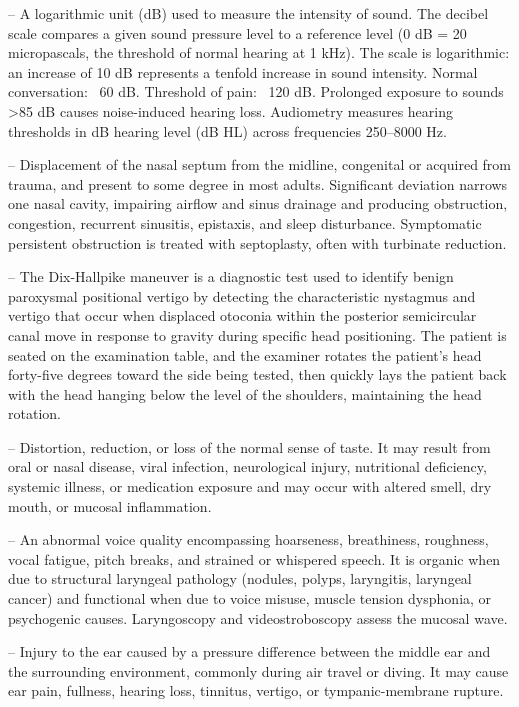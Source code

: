 -- A logarithmic unit (dB) used to measure the intensity of sound. The decibel scale compares a given sound pressure level to a reference level (0 dB = 20 micropascals, the threshold of normal hearing at 1 kHz). The scale is logarithmic: an increase of 10 dB represents a tenfold increase in sound intensity. Normal conversation: ~60 dB. Threshold of pain: ~120 dB. Prolonged exposure to sounds >85 dB causes noise-induced hearing loss. Audiometry measures hearing thresholds in dB hearing level (dB HL) across frequencies 250--8000 Hz.

-- Displacement of the nasal septum from the midline, congenital or acquired from trauma, and present to some degree in most adults. Significant deviation narrows one nasal cavity, impairing airflow and sinus drainage and producing obstruction, congestion, recurrent sinusitis, epistaxis, and sleep disturbance. Symptomatic persistent obstruction is treated with septoplasty, often with turbinate reduction.

-- The Dix-Hallpike maneuver is a diagnostic test used to identify benign paroxysmal positional vertigo by detecting the characteristic nystagmus and vertigo that occur when displaced otoconia within the posterior semicircular canal move in response to gravity during specific head positioning. The patient is seated on the examination table, and the examiner rotates the patient’s head forty-five degrees toward the side being tested, then quickly lays the patient back with the head hanging below the level of the shoulders, maintaining the head rotation.

-- Distortion, reduction, or loss of the normal sense of taste. It may result from oral or nasal disease, viral infection, neurological injury, nutritional deficiency, systemic illness, or medication exposure and may occur with altered smell, dry mouth, or mucosal inflammation.

-- An abnormal voice quality encompassing hoarseness, breathiness, roughness, vocal fatigue, pitch breaks, and strained or whispered speech. It is organic when due to structural laryngeal pathology (nodules, polyps, laryngitis, laryngeal cancer) and functional when due to voice misuse, muscle tension dysphonia, or psychogenic causes. Laryngoscopy and videostroboscopy assess the mucosal wave.

-- Injury to the ear caused by a pressure difference between the middle ear and the surrounding environment, commonly during air travel or diving. It may cause ear pain, fullness, hearing loss, tinnitus, vertigo, or tympanic-membrane rupture.

